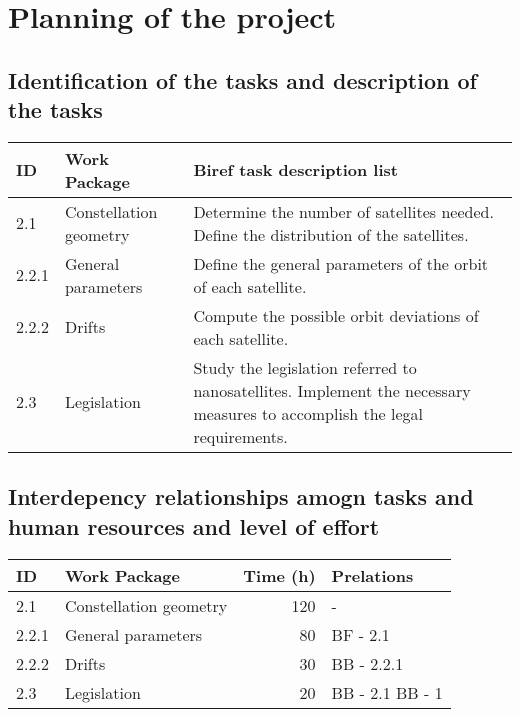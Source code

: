 \documentclass[12pt, titlepage]{article}
\begin{document}
\maketitle

\pagebreak


\section{Planning of the project}


\subsection{Identification of the tasks and description of the tasks}
\begin{tabular}{ | l | l | p{7cm} |}
\hline
ID & Work Package & Biref task description list \\ \hline
2.1 & Constellation geometry & Determine the number of satellites needed. \newline
Define the distribution of the satellites. \\
\hline
2.2.1 & General parameters & Define the general parameters of the orbit of each satellite. \\ \hline
2.2.2 & Drifts & Compute the possible orbit deviations of each satellite. \\ \hline
2.3 & Legislation & Study the legislation referred to nanosatellites. \newline
Implement the necessary measures to accomplish the legal requirements. \\ \hline

\end{tabular}


\subsection{Interdepency relationships amogn tasks and human resources and level of effort}
\begin{tabular}{ | l | l | r | p{5cm} | }
\hline
ID & Work Package & Time (h) & Prelations \\ \hline
2.1 & Constellation geometry & 120 & - \\ \hline
2.2.1 & General parameters & 80 & BF - 2.1 \\ \hline
2.2.2 & Drifts & 30 & BB - 2.2.1 \\ \hline
2.3 & Legislation & 20 & BB - 2.1 \newline
BB - 1 \\
\hline
\end{tabular}
\end{document}
